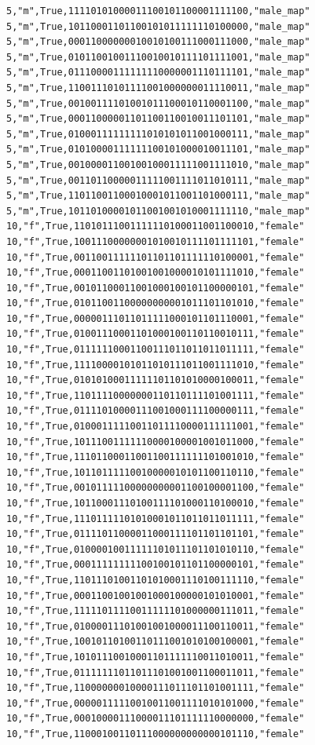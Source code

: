 \documentclass[authoryearcitations]{UoYCSproject}
\begin{document}
\begin{framed}
\begin{verbatim}
5,"m",True,11110101000011100101100001111100,"male_map"
5,"m",True,10110001101100101011111110100000,"male_map"
5,"m",True,00011000000010010100111000111000,"male_map"
5,"m",True,01011001001110010010111101111001,"male_map"
5,"m",True,01110000111111110000001110111101,"male_map"
5,"m",True,11001110101111001000000011110011,"male_map"
5,"m",True,00100111101001011100010110001100,"male_map"
5,"m",True,00011000001101100110010011101101,"male_map"
5,"m",True,01000111111111010101011001000111,"male_map"
5,"m",True,01010000111111100101000010011101,"male_map"
5,"m",True,00100001100100100011111001111010,"male_map"
5,"m",True,00110110000011111001111011010111,"male_map"
5,"m",True,11011001100010001011001101000111,"male_map"
5,"m",True,10110100001011001001010001111110,"male_map"
10,"f",True,11010111001111110100011001100010,"female"
10,"f",True,10011100000001010010111101111101,"female"
10,"f",True,00110011111101101101111110100001,"female"
10,"f",True,00011001101001001000010101111010,"female"
10,"f",True,00101100011001000100101100000101,"female"
10,"f",True,01011001100000000001011101101010,"female"
10,"f",True,00000111011011111000101101110001,"female"
10,"f",True,01001110001101000100110110010111,"female"
10,"f",True,01111110001100111011011011011111,"female"
10,"f",True,11110000101011010111011001111010,"female"
10,"f",True,01010100011111101101010000100011,"female"
10,"f",True,11011110000000110110111101001111,"female"
10,"f",True,01111010000111001000111100000111,"female"
10,"f",True,01000111110011011110000111111001,"female"
10,"f",True,10111001111110000100001001011000,"female"
10,"f",True,11101100011001100111111101001010,"female"
10,"f",True,10110111110010000010101100110110,"female"
10,"f",True,00101111100000000001100100001100,"female"
10,"f",True,10110001110100111101000110100010,"female"
10,"f",True,11101111101010001011011011011111,"female"
10,"f",True,01111011000011000111101101101101,"female"
10,"f",True,01000010011111101011101101010110,"female"
10,"f",True,00011111111100100101101100000101,"female"
10,"f",True,11011101001101010001110100111110,"female"
10,"f",True,00011001001001000100000101010001,"female"
10,"f",True,11111011110011111101000000111011,"female"
10,"f",True,01000011101001001000011100110011,"female"
10,"f",True,10010110100110111001010100100001,"female"
10,"f",True,10101110010001101111110011010011,"female"
10,"f",True,01111111011011101001001100011011,"female"
10,"f",True,11000000010000111011101101001111,"female"
10,"f",True,00000111110010011001111010101000,"female"
10,"f",True,00010000111000011101111110000000,"female"
10,"f",True,11000100110111000000000000101110,"female"

\end{verbatim}
\end{framed}
\end{document}
